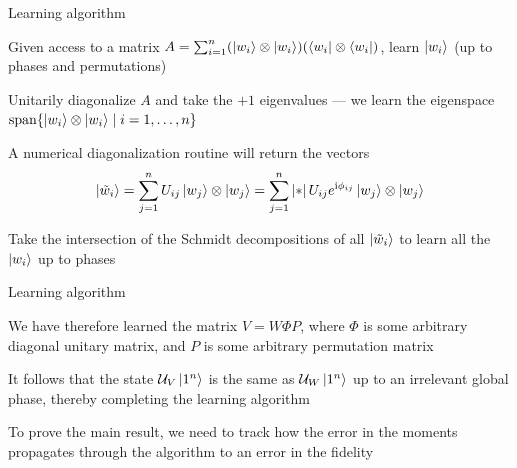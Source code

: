 \begin{frame}{Learning algorithm}
    \begin{block}{}
        Given access to a matrix \(A = \sum_{i=1}^n (\ket{w_i}\otimes \ket{w_i})(\bra{w_i}\otimes \bra{w_i})\), learn \(\ket{w_i}\) (up to phases and permutations)
    \end{block}
    \vfill
    \begin{spaceditemize}
        \item Unitarily diagonalize \(A\) and take the \(+1\) eigenvalues --- we learn the eigenspace \(\text{span}\cbargs{\ket{w_i}\otimes \ket{w_i} \mid i=1,\dots, n}\)
        \item A numerical diagonalization routine will return the vectors
        \begin{equation*}
            \ket{\tilde w_i} = \sum_{j=1}^n U_{ij}\ket{w_j}\otimes \ket{w_j}
            =
            \sum_{j=1}^n \abs*{U_{ij}}e^{\i\phi_{ij}}\ket{w_j}\otimes \ket{w_j}
        \end{equation*}
        \item Take the intersection of the Schmidt decompositions of all \(\ket{\tilde w_i}\) to learn all the \(\ket{w_i}\) up to phases
    \end{spaceditemize}
\end{frame}

\begin{frame}{Learning algorithm}

    \begin{spaceditemize}[2em]
        \item We have therefore learned the matrix \(V = W \Phi P\), where \(\Phi\) is some arbitrary diagonal unitary matrix, and \(P\) is some arbitrary permutation matrix
        \item It follows that the state \( \calU_V \ket{1^n} \) is the same as \( \calU_W \ket{1^n} \) up to an irrelevant global phase, thereby completing the learning algorithm
        \item To prove the main result, we need to track how the error in the moments propagates through the algorithm to an error in the fidelity
    \end{spaceditemize}

\end{frame}
